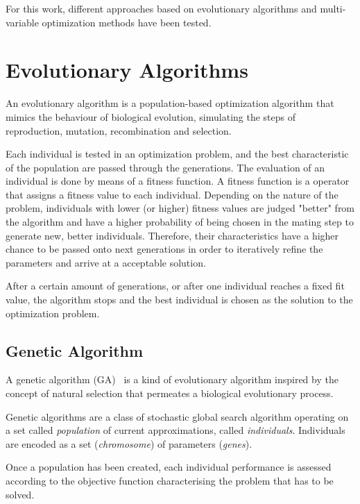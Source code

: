 For this work, different approaches based on evolutionary algorithms
and multi-variable optimization methods have been tested.


\section{Evolutionary Algorithms}
\label{sec:5.evo}

An evolutionary algorithm is a population-based optimization algorithm
that mimics the behaviour of biological evolution, simulating the steps of
reproduction, mutation, recombination and selection.

Each individual is tested in an optimization problem,
and the best characteristic of the population are passed through the generations.
The evaluation of an individual is done by means of a fitness function.
A fitness function is a operator that assigns a fitness value to each individual.
Depending on the nature of the problem, individuals with lower (or higher)
fitness values are judged "better" from the algorithm and have a higher probability
of being chosen in the mating step to generate new, better individuals.
Therefore, their characteristics have a higher chance to be passed onto next generations
in order to iteratively refine the parameters and arrive at a acceptable solution.

After a certain amount of generations, or after one individual reaches
a fixed fit value, the algorithm stops and the best individual is chosen
as the solution to the optimization problem.

\subsection{Genetic Algorithm}
\label{sec:5.ga}

A genetic algorithm (GA)~\cite{fleming2001genetic} is a kind of evolutionary algorithm inspired
by the concept of natural selection that permeates a biological evolutionary process.

Genetic algorithms are a class of stochastic global search algorithm
operating on a set called \textit{population} of current approximations,
called \textit{individuals}.
Individuals are encoded as a set (\textit{chromosome}) of parameters (\textit{genes}).

Once a population has been created, each individual performance is assessed
according to the objective function characterising the problem that has to be solved.

